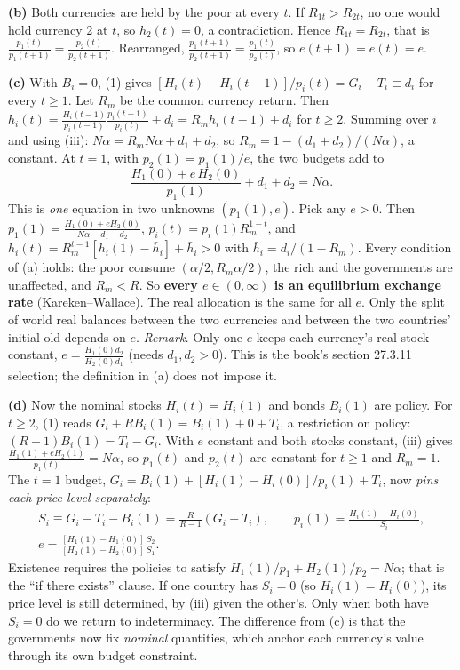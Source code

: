 \documentclass[12pt, letterpaper]{article}
\begin{document}
\begin{tcolorbox}[evenbox,title={Exercise 9.6 \quad Exchange rate determinacy}]
\textbf{(b)} Both currencies are held by the poor at every $t$. If $R_{1t}>R_{2t}$, no one would hold
currency 2 at $t$, so $h_2(t)=0$, a contradiction. Hence $R_{1t}=R_{2t}$, that is
$\frac{p_1(t)}{p_1(t+1)}=\frac{p_2(t)}{p_2(t+1)}$. Rearranged, $\frac{p_1(t+1)}{p_2(t+1)}=\frac{p_1(t)}{p_2(t)}$,
so $e(t+1)=e(t)=e$.

\textbf{(c)} With $B_i=0$, (1) gives $[H_i(t)-H_i(t-1)]/p_i(t)=G_i-T_i\equiv d_i$ for every $t\ge1$.
Let $R_m$ be the common currency return. Then
$h_i(t)=\frac{H_i(t-1)}{p_i(t-1)}\frac{p_i(t-1)}{p_i(t)}+d_i=R_mh_i(t-1)+d_i$ for $t\ge2$. Summing over
$i$ and using (iii): $N\alpha=R_mN\alpha+d_1+d_2$, so $R_m=1-(d_1+d_2)/(N\alpha)$, a constant. At
$t=1$, with $p_2(1)=p_1(1)/e$, the two budgets add to
\[
\frac{H_1(0)+e\,H_2(0)}{p_1(1)}+d_1+d_2=N\alpha .
\]
This is \emph{one} equation in two unknowns $(p_1(1),e)$. Pick any $e>0$. Then
$p_1(1)=\frac{H_1(0)+eH_2(0)}{N\alpha-d_1-d_2}$, $p_i(t)=p_i(1)R_m^{1-t}$, and
$h_i(t)=R_m^{t-1}[h_i(1)-\bar h_i]+\bar h_i>0$ with $\bar h_i=d_i/(1-R_m)$. Every condition of (a)
holds: the poor consume $(\alpha/2,R_m\alpha/2)$, the rich and the governments are unaffected, and
$R_m<R$. So \textbf{every $e\in(0,\infty)$ is an equilibrium exchange rate} (Kareken--Wallace). The
real allocation is the same for all $e$. Only the split of world real balances between the two
currencies and between the two countries' initial old depends on $e$. \emph{Remark.} Only one $e$
keeps each currency's real stock constant, $e=\frac{H_1(0)d_2}{H_2(0)d_1}$ (needs $d_1,d_2>0$). This
is the book's section 27.3.11 selection; the definition in (a) does not impose it.

\textbf{(d)} Now the nominal stocks $H_i(t)=H_i(1)$ and bonds $B_i(1)$ are policy. For $t\ge2$, (1)
reads $G_i+RB_i(1)=B_i(1)+0+T_i$, a restriction on policy: $(R-1)B_i(1)=T_i-G_i$. With $e$ constant
and both stocks constant, (iii) gives $\frac{H_1(1)+eH_2(1)}{p_1(t)}=N\alpha$, so $p_1(t)$ and
$p_2(t)$ are constant for $t\ge1$ and $R_m=1$. The $t=1$ budget, $G_i=B_i(1)+[H_i(1)-H_i(0)]/p_i(1)+T_i$,
now \emph{pins each price level separately}:
\begin{gather*}
S_i\equiv G_i-T_i-B_i(1)=\frac{R}{R-1}(G_i-T_i),\qquad p_i(1)=\frac{H_i(1)-H_i(0)}{S_i},\\
\boxed{e=\frac{[H_1(1)-H_1(0)]\,S_2}{[H_2(1)-H_2(0)]\,S_1}.}
\end{gather*}
Existence requires the policies to satisfy $H_1(1)/p_1+H_2(1)/p_2=N\alpha$; that is the ``if there
exists'' clause. If one country has $S_i=0$ (so $H_i(1)=H_i(0)$), its price level is still
determined, by (iii) given the other's. Only when both have $S_i=0$ do we return to indeterminacy.
The difference from (c) is that the governments now fix \emph{nominal} quantities, which anchor each
currency's value through its own budget constraint.


\end{tcolorbox}
\end{document}
